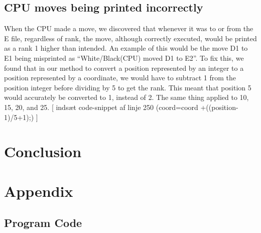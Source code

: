 \documentclass[12pt, a4paper]{article}
\begin{document}
	\subsection{CPU moves being printed incorrectly}
	When the CPU made a move, we discovered that whenever it was to or from the E file, regardless of rank, the move, although correctly executed, would be printed as a rank 1 higher than intended. An example of this would be the move D1 to E1 being misprinted as “White/Black(CPU) moved D1 to E2”. To fix this, we found that in our method to convert a position represented by an integer to a position represented by a coordinate, we would have to subtract 1 from the position integer before dividing by 5 to get the rank. This meant that position 5 would accurately be converted to 1, instead of 2. The same thing applied to 10, 15, 20, and 25.
	[ indsæt code-snippet af linje 250 (coord=coord +((position-1)/5+1);) ]
	
	\section{Conclusion}
	\section{Appendix}
	\subsection{Program Code}
	
\end{document}
